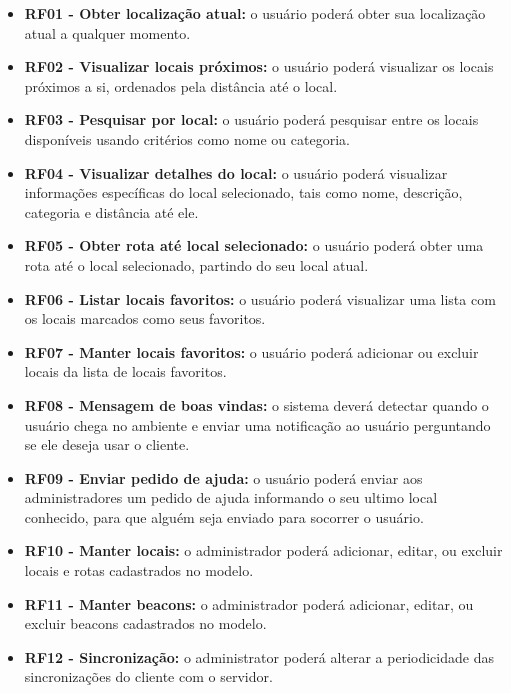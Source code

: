 \documentclass[english,brazilian]{UNISINOSmonografia}
\begin{document}
	\begin{itemize}
		\item \textbf{RF01 - Obter localização atual:} o usuário poderá obter sua localização atual a qualquer momento.
		
		\item \textbf{RF02 - Visualizar locais próximos:} o usuário poderá visualizar os locais próximos a si, ordenados pela distância até o local.
		
		\item \textbf{RF03 - Pesquisar por local:} o usuário poderá pesquisar entre os locais disponíveis usando critérios como nome ou categoria.
		
		\item \textbf{RF04 - Visualizar detalhes do local:} o usuário poderá visualizar informações específicas do local selecionado, tais como nome, descrição, categoria e distância até ele.

		\item \textbf{RF05 - Obter rota até local selecionado:} o usuário poderá obter uma rota até o local selecionado, partindo do seu local atual.

		\item \textbf{RF06 - Listar locais favoritos:} o usuário poderá visualizar uma lista com os locais marcados como seus favoritos.
		
		\item \textbf{RF07 - Manter locais favoritos:} o usuário poderá adicionar ou excluir locais da lista de locais favoritos.
		
		\item \textbf{RF08 - Mensagem de boas vindas:} o sistema deverá detectar quando o usuário chega no ambiente e enviar uma notificação ao usuário perguntando se ele deseja usar o cliente.

		\item \textbf{RF09 - Enviar pedido de ajuda:} o usuário poderá enviar aos administradores um pedido de ajuda informando o seu ultimo local conhecido, para que alguém seja enviado para socorrer o usuário.

		
		\item \textbf{RF10 - Manter locais:} o administrador poderá adicionar, editar, ou excluir locais e rotas cadastrados no modelo.
		
		\item \textbf{RF11 - Manter beacons:} o administrador poderá adicionar, editar, ou excluir beacons cadastrados no modelo.

		\item \textbf{RF12 - Sincronização:} o administrator poderá alterar a periodicidade das sincronizações do cliente com o servidor.

	\end{itemize}
\end{document}

